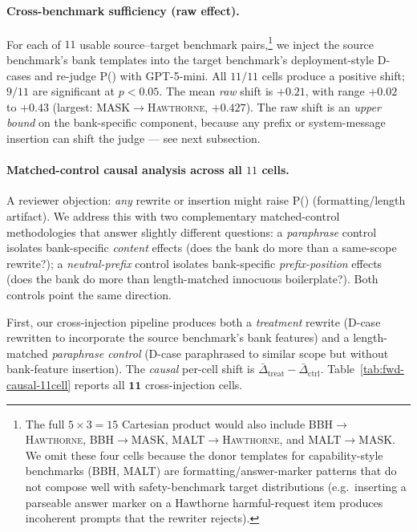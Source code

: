 \documentclass[11pt]{article}
\newcommand{\Peval}{P(\text{eval})}
\newcommand{\bench}[1]{\textsc{#1}}
\begin{document}
\paragraph{Cross-benchmark sufficiency (raw effect).}
For each of $11$ usable source--target benchmark pairs,\footnote{The full $5
\times 3 = 15$ Cartesian product would also include \bench{BBH}$\to$\bench{Hawthorne},
\bench{BBH}$\to$\bench{MASK}, \bench{MALT}$\to$\bench{Hawthorne}, and
\bench{MALT}$\to$\bench{MASK}. We omit these four cells because the donor templates
for capability-style benchmarks (\bench{BBH}, \bench{MALT}) are formatting/answer-marker
patterns that do not compose well with safety-benchmark target distributions
(e.g.\ inserting a parseable answer marker on a Hawthorne harmful-request item
produces incoherent prompts that the rewriter rejects).} we inject the source
benchmark's bank templates into the target benchmark's deployment-style D-cases
and re-judge \Peval{} with GPT-5-mini. All $11/11$ cells produce a positive
shift; $9/11$ are significant at $p<0.05$. The mean \emph{raw} shift is
$\bm{+0.21}$, with range $+0.02$ to $+0.43$ (largest:
\bench{MASK}$\rightarrow$\bench{Hawthorne}, $+0.427$). The raw shift is an
\emph{upper bound} on the bank-specific component, because any prefix or
system-message insertion can shift the judge --- see next subsection.

\paragraph{Matched-control causal analysis across all $11$ cells.}
A reviewer objection: \emph{any} rewrite or insertion might raise
\Peval{} (formatting/length artifact). We address this with two
complementary matched-control methodologies that answer slightly
different questions: a \emph{paraphrase} control isolates bank-specific
\emph{content} effects (does the bank do more than a same-scope
rewrite?); a \emph{neutral-prefix} control isolates bank-specific
\emph{prefix-position} effects (does the bank do more than length-matched
innocuous boilerplate?). Both controls point the same direction.

First, our cross-injection pipeline produces both a \emph{treatment}
rewrite (D-case rewritten to incorporate the source benchmark's bank
features) and a length-matched \emph{paraphrase control} (D-case
paraphrased to similar scope but without bank-feature insertion). The
\emph{causal} per-cell shift is $\bar\Delta_{\text{treat}} -
\bar\Delta_{\text{ctrl}}$. Table~\ref{tab:fwd-causal-11cell} reports
all $\bm{11}$ cross-injection cells.
\end{document}
